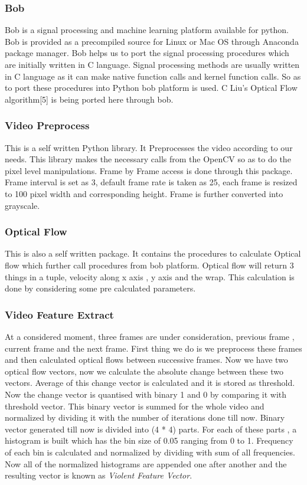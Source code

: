 \subsubsection{Bob}
Bob\cite{bob} is a signal processing and machine learning platform available for python. Bob is provided as a precompiled source for Linux or Mac OS through Anaconda package manager. Bob helps us to port the signal processing procedures which are initially written in C language. Signal processing methods are usually written in C language as it can make native function calls and kernel function calls. So as to port these procedures into Python bob platform is used. C Liu's Optical Flow algorithm[5] is being ported here through bob.
\subsubsection{Video Preprocess}
This is a self written Python library. It Preprocesses the video according to our needs. This library makes the necessary calls from the OpenCV so as to do the pixel level manipulations. Frame by Frame access is done through this package. Frame interval is set as 3, default frame rate is taken as 25, each frame is resized to 100 pixel width and corresponding height. Frame is further converted into grayscale.
\subsubsection{Optical Flow}
This is also a self written package. It contains the procedures to calculate Optical flow\cite{liu} which further call procedures from bob platform. Optical flow will return 3 things in a tuple, velocity along x axis , y axis and the wrap. This calculation is done by considering some pre calculated parameters.
\subsubsection{Video Feature Extract}
At a considered moment, three frames are under consideration, previous frame , current frame and the next frame. First thing we do is we preprocess these frames and then calculated optical flows between successive frames. Now we have two optical flow vectors, now we calculate the absolute change between these two vectors. Average of this change vector is calculated and it is stored as threshold. Now the change vector is quantised with binary 1 and 0 by comparing it with threshold vector. This binary vector is summed for the whole video and normalized by dividing it with the number of iterations done till now. Binary vector generated till now is divided into (4 * 4) parts. For each of these parts , a histogram is built which has the bin size of 0.05 ranging from 0 to 1. Frequency of each bin is calculated and normalized by dividing with sum of all frequencies. Now all of the normalized histograms are appended one after another and the resulting vector is known as \textit{Violent Feature Vector}.



